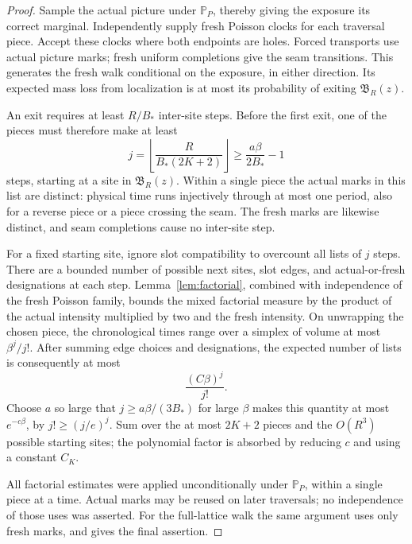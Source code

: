 \begin{proof}
Sample the actual picture under \(\mathbb P_P\), thereby giving
the exposure its correct marginal.  Independently supply fresh
Poisson clocks for each traversal piece.  Accept these clocks where
both endpoints are holes.  Forced transports use actual picture
marks; fresh uniform completions give the seam transitions.  This
generates the fresh walk conditional on the exposure, in either
direction.  Its expected mass loss from localization is at most
its probability of exiting \(\mathfrak B_R(z)\).

An exit requires at least \(R/B_*\) inter-site steps.  Before the
first exit, one of the pieces must therefore make at least
\[
 j=\left\lfloor\frac{R}{B_*(2K+2)}\right\rfloor
 \ge\frac{a\beta}{2B_*}-1
\]
steps, starting at a site in \(\mathfrak B_R(z)\).  Within a
single piece the actual marks in this list are distinct: physical
time runs injectively through at most one period, also for a reverse
piece or a piece crossing the seam.  The fresh marks are likewise
distinct, and seam completions cause no inter-site step.

For a fixed starting site, ignore slot compatibility to overcount
all lists of \(j\) steps.  There are a bounded number of possible
next sites, slot edges, and actual-or-fresh designations at each
step.  Lemma~\ref{lem:factorial}, combined with independence of
the fresh Poisson family, bounds the mixed factorial measure by
the product of the actual intensity multiplied by two and the
fresh intensity.  On unwrapping the chosen piece, the chronological
times range over a simplex of volume at most \(\beta^j/j!\).
After summing edge choices and designations, the expected number
of lists is consequently at most
\[
 \frac{(C\beta)^j}{j!}.
\]
Choose \(a\) so large that \(j\ge a\beta/(3B_*)\) for large
\(\beta\) makes this quantity at most \(e^{-c\beta}\), by
\(j!\ge(j/e)^j\).  Sum over the at most \(2K+2\) pieces and
the \(O(R^3)\) possible starting sites; the polynomial factor is
absorbed by reducing \(c\) and using a constant \(C_K\).

All factorial estimates were applied unconditionally under
\(\mathbb P_P\), within a single piece at a time.  Actual marks
may be reused on later traversals; no independence of those uses
was asserted.  For the full-lattice walk the same argument uses
only fresh marks, and gives the final assertion.
\end{proof}

